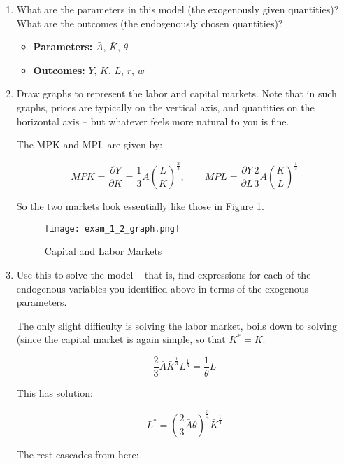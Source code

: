 \documentclass{article}
\newenvironment{solution}{\color{red}}{\color{black}}
\begin{document}
\begin{enumerate}
\item What are the parameters in this model (the exogenously given quantities)? What are the outcomes (the endogenously chosen quantities)?

\begin{solution}
\begin{itemize}
\item \textbf{Parameters:} $\bar{A}$, $\bar{K}$, $\theta$
\item \textbf{Outcomes:} $Y$, $K$, $L$, $r$, $w$
\end{itemize}
\end{solution}

\item Draw graphs to represent the labor and capital markets. Note that in such graphs, prices are typically on the vertical axis, and quantities on the horizontal axis -- but whatever feels more natural to you is fine.

\begin{solution}
The MPK and MPL are given by:

\[ MPK = \frac{\partial Y}{\partial K} = \frac13 \bar{A} \left( \frac{L}{K} \right)^\frac23, \qquad MPL = \frac{\partial Y}{\partial L} \frac23 \bar{A} \left( \frac{K}{L} \right)^\frac13 \]

So the two markets look essentially like those in Figure \ref{labor}.

\begin{figure}[htbp]
\centering
\texttt{[image: exam\_1\_2\_graph.png]}
\caption{Capital and Labor Markets}
\label{labor}
\end{figure}
\end{solution}

\item Use this to solve the model -- that is, find expressions for each of the endogenous variables you identified above in terms of the exogenous parameters.

\begin{solution}
The only slight difficulty is solving the labor market, boils down to solving (since the capital market is again simple, so that $K^{*} = \bar{K}$:

\[ \frac23 \bar{A} \bar{K}^\frac13 L^\frac13 = \frac1{\theta} L \]

This has solution:

\[ L^{*} = \left(\frac23 \bar{A} \theta \right)^\frac34 \bar{K}^\frac14 \]

The rest cascades from here:


\end{solution}
\end{enumerate}
\end{document}
